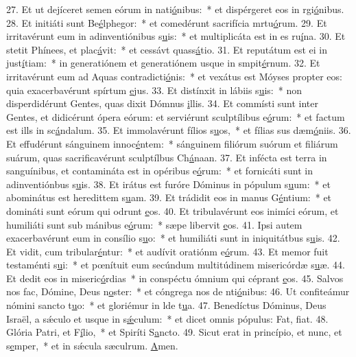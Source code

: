 27. Et ut dejíceret semen eórum in nati\uline{ó}nibus:~* et dispérgeret eos in rgi\uline{ó}nibus.
28. Et initiáti sunt Be\uline{é}lphegor:~* et comedérunt sacrifícia mrtu\uline{ó}rum.
29. Et irritavérunt eum in adinventiónibus s\uline{u}is:~* et multiplicáta est in es ru\uline{í}na.
30. Et stetit Phínees, et plac\uline{á}vit:~* et cessávt quass\uline{á}tio.
31. Et reputátum est ei in just\uline{í}tiam:~* in generatiónem et generatiónem usque in smpit\uline{é}rnum.
32. Et irritavérunt eum ad Aquas contradicti\uline{ó}nis:~* et vexátus est Móyses propter eos: quia exacerbavérunt spírtum \uline{e}jus.
33. Et distínxit in lábiis s\uline{u}is:~* non disperdidérunt Gentes, quas dixit Dómnus \uline{i}llis.
34. Et commísti sunt inter Gentes, et didicérunt ópera eórum: et serviérunt sculptílibus e\uline{ó}rum:~* et factum est ills in sc\uline{á}ndalum.
35. Et immolavérunt fílios s\uline{u}os,~* et fílias sus dæm\uline{ó}niis.
36. Et effudérunt sánguinem innoc\uline{é}ntem:~* sánguinem filiórum suórum et filiárum suárum, quas sacrificavérunt sculptílbus Ch\uline{á}naan.
37. Et infécta est terra in sanguínibus, et contamináta est in opéribus e\uline{ó}rum:~* et fornicáti sunt in adinventiónbus s\uline{u}is.
38. Et irátus est furóre Dóminus in pópulum s\uline{u}um:~* et abominátus est heredittem s\uline{u}am.
39. Et trádidit eos in manus G\uline{é}ntium:~* et domináti sunt eórum qui odrunt \uline{e}os.
40. Et tribulavérunt eos inimíci eórum, et humiliáti sunt sub mánibus e\uline{ó}rum:~* sæpe libervit \uline{e}os.
41. Ipsi autem exacerbavérunt eum in consílio s\uline{u}o:~* et humiliáti sunt in iniquitátbus s\uline{u}is.
42. Et vidit, cum tribular\uline{é}ntur:~* et audívit oratiónm e\uline{ó}rum.
43. Et memor fuit testaménti s\uline{u}i:~* et pœnítuit eum secúndum multitúdinem misericórdæ s\uline{u}æ.
44. Et dedit eos in miseric\uline{ó}rdias~* in conspéctu ómnium qui céprant \uline{e}os.
45. Salvos nos fac, Dómine, Deus n\uline{o}ster:~* et cóngrega nos de nti\uline{ó}nibus:
46. Ut confiteámur nómini sancto t\uline{u}o:~* et gloriémur in lde t\uline{u}a.
47. Benedíctus Dóminus, Deus Israël, a sǽculo et usque in s\uline{ǽ}culum:~* et dicet omnis pópulus: Fat, f\uline{i}at.
48. Glória Patri, et F\uline{í}lio,~* et Spiríti S\uline{a}ncto.
49. Sicut erat in princípio, et nunc, et s\uline{e}mper,~* et in sǽcula sæculrum. \uline{A}men.
